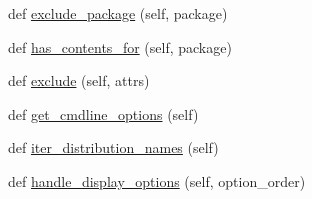 \begin{DoxyCompactItemize}
\item 
def \hyperlink{classsetuptools_1_1dist_1_1Distribution_afc5f2e32b85d40dbd223aa3e1bd33cf9}{exclude\+\_\+package} (self, package)
\item 
def \hyperlink{classsetuptools_1_1dist_1_1Distribution_a0d99480ae4beb9ec35a2c99a46721af6}{has\+\_\+contents\+\_\+for} (self, package)
\item 
def \hyperlink{classsetuptools_1_1dist_1_1Distribution_a5245d1b73f3cb0241bb7cef9644e9747}{exclude} (self, attrs)
\item 
def \hyperlink{classsetuptools_1_1dist_1_1Distribution_ac8c369e93a63e253f99d4d2ae842b250}{get\+\_\+cmdline\+\_\+options} (self)
\item 
def \hyperlink{classsetuptools_1_1dist_1_1Distribution_a598f1821d0e4868b2f1863eae1c2c945}{iter\+\_\+distribution\+\_\+names} (self)
\item 
def \hyperlink{classsetuptools_1_1dist_1_1Distribution_ad44e7069904a39a05010160a5b365e4a}{handle\+\_\+display\+\_\+options} (self, option\+\_\+order)
\end{DoxyCompactItemize}
